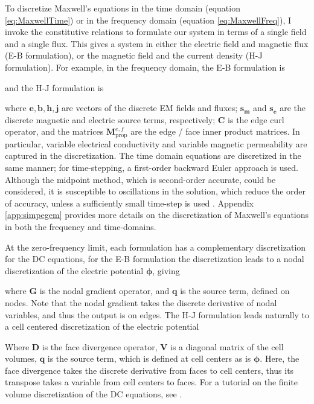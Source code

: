 

To discretize Maxwell's equations in the time domain (equation \ref{eq:MaxwellTime}) or in the frequency domain (equation \ref{eq:MaxwellFreq}), I invoke the constitutive relations to formulate our system in terms of a single field and a single flux. This gives a system in either the electric field and magnetic flux (E-B formulation), or the magnetic field and the current density (H-J formulation). For example, in the frequency domain, the E-B formulation is

and the H-J formulation is

where $\mathbf{e}, \mathbf{b}, \mathbf{h}, \mathbf{j}$ are vectors of the discrete EM fields and fluxes; $\mathbf{s_m}$ and $\mathbf{s_e}$ are the discrete magnetic and electric source terms, respectively; $\mathbf{C}$ is the edge curl operator, and the matrices $\mathbf{M}_{\text{prop}}^{e,f}$ are the edge / face inner product matrices. In particular, variable electrical conductivity and variable magnetic permeability are captured in the discretization. The time domain equations are discretized in the same manner; for time-stepping, a first-order backward Euler approach is used. Although the midpoint method, which is second-order accurate, could be considered, it is susceptible to oscillations in the solution, which reduce the order of accuracy, unless a sufficiently small time-step is used \citep{Haber2004, Haber2014}.  Appendix \ref{app:simpegem} provides more details on the discretization of Maxwell's equations in both the frequency and time-domains.

At the zero-frequency limit, each formulation has a complementary discretization for the DC equations, for the E-B formulation the discretization leads to a nodal discretization of the electric potential $\boldsymbol{\phi}$, giving

where $\mathbf{G}$ is the nodal gradient operator, and $\mathbf{q}$ is the source term, defined on nodes. Note that the nodal gradient takes the discrete derivative of nodal variables, and thus the output is on edges. The H-J formulation leads naturally to a cell centered discretization of the electric potential

Where $\mathbf{D}$ is the face divergence operator, $\mathbf{V}$ is a diagonal matrix of the cell volumes, $\mathbf{q}$ is the source term, which is  defined at cell centers as is $\boldsymbol{\phi}$. Here, the face divergence takes the discrete derivative from faces to cell centers, thus its transpose takes a variable from cell centers to faces. For a tutorial on the finite volume discretization of the DC equations, see \citep{Cockett2016}.

